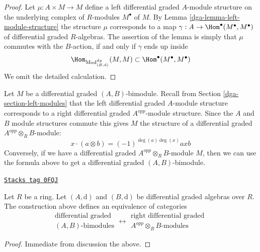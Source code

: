 \begin{proof}

Let $\mu : A \times M \to M$ define a left differential graded $A$-module
structure on the underlying complex of $R$-modules $M^\bullet$ of $M$.
By Lemma \ref{dga-lemma-left-module-structure} the structure $\mu$ corresponds
to a map $\gamma : A \to \Hom^\bullet(M^\bullet, M^\bullet)$
of differential graded $R$-algebras. The assertion of the lemma is simply
that $\mu$ commutes with the $B$-action, if and only if $\gamma$ ends
up inside
$$
\Hom_{\text{Mod}^{dg}_{(B, \text{d})}}(M, M) \subset
\Hom^\bullet(M^\bullet, M^\bullet)
$$
We omit the detailed calculation.
\end{proof}

Let $M$ be a differential graded $(A, B)$-bimodule. Recall from
Section \ref{dga-section-left-modules} that the left differential graded
$A$-module structure corresponds to a right differential graded
$A^{opp}$-module structure. Since the $A$ and $B$ module structures
commute this gives $M$ the structure of a differential graded
$A^{opp} \otimes_R B$-module:
$$
x \cdot (a \otimes b) = (-1)^{\deg(a)\deg(x)} axb
$$
Conversely, if we have a differential graded $A^{opp} \otimes_R B$-module
$M$, then we can use the formula above to get a differential graded
$(A, B)$-bimodule.

\begin{lemma}
\label{dga-lemma-bimodule-over-tensor}
\href{https://stacks.math.columbia.edu/tag/0FQJ}{\texttt{Stacks tag 0FQJ}}

Let $R$ be a ring. Let $(A, \text{d})$ and $(B, \text{d})$
be differential graded algebras over $R$. The construction above
defines an equivalence of categories
$$
\begin{matrix}
\text{differential graded}\\
(A, B)\text{-bimodules}
\end{matrix}
\longleftrightarrow
\begin{matrix}
\text{right differential graded }\\
A^{opp} \otimes_R B\text{-modules}
\end{matrix}
$$
\end{lemma}

\begin{proof}
Immediate from discussion the above.
\end{proof}

